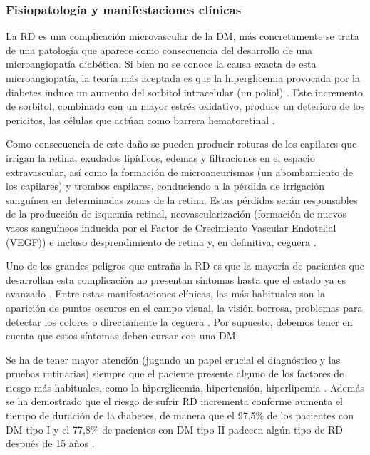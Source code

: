 \subsubsection{Fisiopatología y manifestaciones clínicas}

La RD es una complicación microvascular de la DM, más concretamente se trata de una patología que aparece como consecuencia del desarrollo de una microangiopatía diabética. Si bien no se conoce la causa exacta de esta microangiopatía, la teoría más aceptada es que la hiperglicemia provocada por la diabetes induce un aumento del sorbitol intracelular (un poliol) \cite{retinopatia:cheung}. Este incremento de sorbitol, combinado con un mayor estrés oxidativo, produce un deterioro de los pericitos, las células que actúan como barrera hematoretinal \cite{retinopatia:chile}.

Como consecuencia de este daño se pueden producir roturas de los capilares que irrigan la retina, exudados lipídicos, edemas  y filtraciones en el espacio extravascular, así como la formación de microaneurismas (un abombamiento de los capilares) y trombos capilares, conduciendo a la pérdida de irrigación sanguínea en determinadas zonas de la retina. Estas pérdidas serán responsables de la producción de isquemia retinal, neovascularización (formación de nuevos vasos sanguíneos inducida por el Factor de Crecimiento Vascular Endotelial (VEGF)) e incluso desprendimiento de retina y, en definitiva, ceguera \cite{retinopatia:chile,retinopatia:cheung}. 

Uno de los grandes peligros que entraña la RD es que la mayoría de pacientes que desarrollan esta complicación no presentan síntomas hasta que el estado ya es avanzado \cite{diabetes:JDI}. Entre estas manifestaciones clínicas, las más habituales son la aparición de puntos oscuros en el campo visual, la visión borrosa, problemas para detectar los colores o directamente la ceguera \cite{retinopatia:sintomas}. Por supuesto, debemos tener en cuenta que estos síntomas deben cursar con una DM.

Se ha de tener mayor atención (jugando un papel crucial el diagnóstico y las pruebas rutinarias) siempre que el paciente presente alguno de los factores de riesgo más habituales, como la hiperglicemia, hipertensión, hiperlipemia \cite{diabetes:JDI}. Además se ha demostrado que el riesgo de sufrir RD incrementa conforme aumenta el tiempo de duración de la diabetes, de manera que el 97,5\% de los pacientes con DM tipo I y el 77,8\% de pacientes con DM tipo II padecen algún tipo de RD después de 15 años \cite{retinopatia:chile}.

